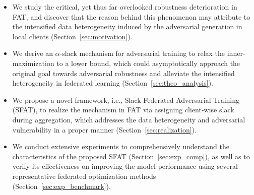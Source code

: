 \documentclass{article} %
\theoremstyle{plain}
\theoremstyle{definition}
\theoremstyle{remark}
\begin{document}
\begin{itemize}
    \item We study the critical, yet thus far overlooked robustness deterioration in FAT, and discover that the reason behind this phenomenon may attribute to the intensified data heterogeneity induced by the adversarial generation in local clients (Section~\ref{sec:motivation}).
    \item We derive an $\alpha$-slack mechanism for adversarial training to relax the inner-maximization to a lower bound, which could asymptotically approach the original goal towards adversarial robustness and alleviate the intensified heterogeneity in federated learning (Section~\ref{sec:theo_analysis}).
    \item We propose a novel framework, i.e., Slack Federated Adversarial Training (SFAT), to realize the mechanism in FAT via assigning client-wise slack during aggregation, which addresses the data heterogeneity and adversarial vulnerability in a proper manner (Section~\ref{sec:realization}).
    \item We conduct extensive experiments to comprehensively understand the characteristics of the proposed SFAT (Section~\ref{sec:exp_comp}), as well as to verify its effectiveness on improving the model performance using several representative federated optimization methods (Section~\ref{sec:exp_benchmark}).
\end{itemize}
\end{document}
